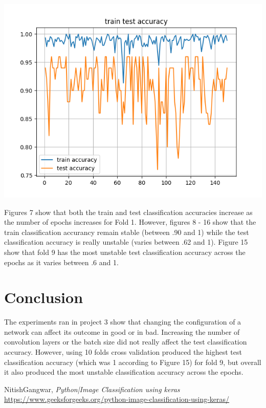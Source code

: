 \documentclass[12pt]{article}
\begin{document}
		\includegraphics[width=\linewidth - 2cm]{accuracy_fold9.png}
		
		Figures 7 show that both the train and test classification accuracies increase as the number of epochs increases for Fold 1. However, figures 8 - 16 show that the train classification accurancy remain stable (between .90 and 1) while the test classification accuracy is really unstable (varies between .62 and 1). Figure 15 show that fold 9 has the most unstable test classification accuracy across the epochs as it varies between .6 and 1.
	
	\section{Conclusion}
		The experiments ran in project 3 show that changing the configuration of a network can affect its outcome in good or in bad. Increasing the number of convolution layers or the batch size did not really affect the test classification accuracy. However, using 10 folds cross validation produced the highest test classification accuracy (which was 1 according to Figure 15) for fold 9, but overall it also produced the most unstable classification accuracy across the epochs.
	
		
	\begin{thebibliography}{1}
		
		 NitishGangwar, \textit{Python|Image Classification using keras} \url{https://www.geeksforgeeks.org/python-image-classification-using-keras/}
			\end{thebibliography}
\end{document}
